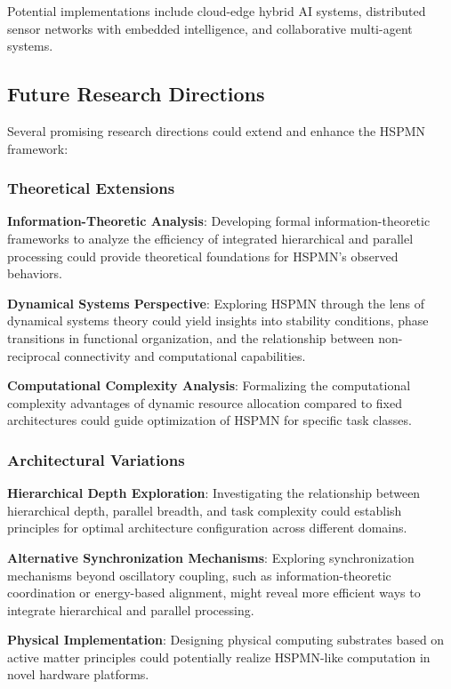 \documentclass[11pt,a4paper,twocolumn]{article}
\begin{document}
Potential implementations include cloud-edge hybrid AI systems, distributed sensor networks with embedded intelligence, and collaborative multi-agent systems.

\subsection{Future Research Directions}

Several promising research directions could extend and enhance the HSPMN framework:

\subsubsection{Theoretical Extensions}

\textbf{Information-Theoretic Analysis}: Developing formal information-theoretic frameworks to analyze the efficiency of integrated hierarchical and parallel processing could provide theoretical foundations for HSPMN's observed behaviors.

\textbf{Dynamical Systems Perspective}: Exploring HSPMN through the lens of dynamical systems theory could yield insights into stability conditions, phase transitions in functional organization, and the relationship between non-reciprocal connectivity and computational capabilities.

\textbf{Computational Complexity Analysis}: Formalizing the computational complexity advantages of dynamic resource allocation compared to fixed architectures could guide optimization of HSPMN for specific task classes.

\subsubsection{Architectural Variations}

\textbf{Hierarchical Depth Exploration}: Investigating the relationship between hierarchical depth, parallel breadth, and task complexity could establish principles for optimal architecture configuration across different domains.

\textbf{Alternative Synchronization Mechanisms}: Exploring synchronization mechanisms beyond oscillatory coupling, such as information-theoretic coordination or energy-based alignment, might reveal more efficient ways to integrate hierarchical and parallel processing.

\textbf{Physical Implementation}: Designing physical computing substrates based on active matter principles could potentially realize HSPMN-like computation in novel hardware platforms.
\end{document}
